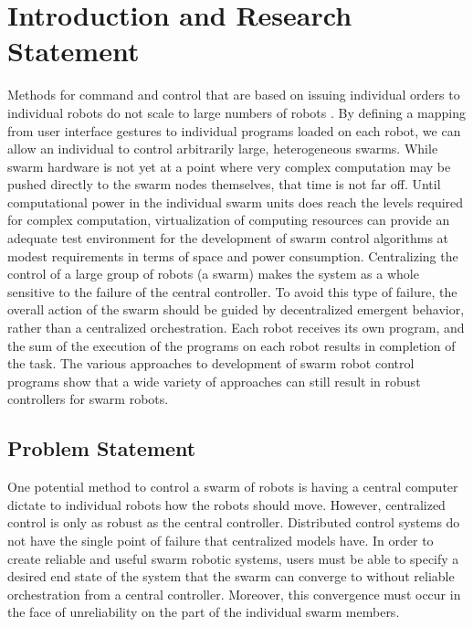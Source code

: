 \chapter{Introduction and Research Statement}

Methods for command and control that are based on issuing individual orders to individual robots do not scale to large numbers of robots \citep{WangSearchScale}.
By defining a mapping from user interface gestures to individual programs loaded on each robot, we can allow an individual to control arbitrarily large, heterogeneous swarms.
While swarm hardware is not yet at a point where very complex computation may be pushed directly to the swarm nodes themselves, that time is not far off. 
Until computational power in the individual swarm units does reach the levels required for complex computation, virtualization of computing resources can provide an adequate test environment for the development of swarm control algorithms at modest requirements in terms of space and power consumption. 
Centralizing the control of a large group of robots (a swarm) makes the system as a whole sensitive to the failure of the central controller. 
To avoid this type of failure, the overall action of the swarm should be guided by decentralized emergent behavior, rather than a centralized orchestration. 
Each robot receives its own program, and the sum of the execution of the programs on each robot results in completion of the task.
The various approaches to development of swarm robot control programs show that a wide variety of approaches can still result in robust controllers for swarm robots. 

\section{Problem Statement}

One potential method to control a swarm of robots is having a central computer dictate to individual robots how the robots should move.
However, centralized control is only as robust as the central controller. 
Distributed control systems do not have the single point of failure that centralized models have. 
In order to create reliable and useful swarm robotic systems, users must be able to specify a desired end state of the system that the swarm can converge to without reliable orchestration from a central controller. 
Moreover, this convergence must occur in the face of unreliability on the part of the individual swarm members. 

